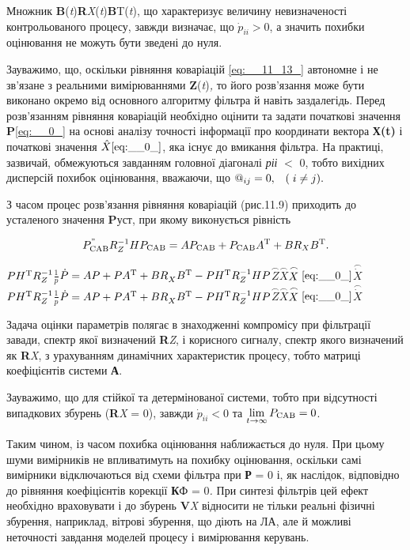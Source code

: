 Множник \textbf{B}(\textit{t})\textbf{R}\textit{X}(\textit{t})\textbf{B}T(\textit{t}), 
що характеризує величину невизначеності  контрольованого процесу, завжди визначає, 
що $\dot{p}_{ii} >0$, а значить похибки оцінювання не можуть бути зведені до нуля.

Зауважимо, 
що, оскільки рівняння коваріацій \eqref{eq:__11_13_} автономне і не зв'язане 
з реальними вимірюваннями \textbf{Z}(\textit{t})\textit{,} то його розв'язання може 
бути виконано окремо від основного алгоритму фільтра й навіть заздалегідь. Перед 
розв'язанням рівняння коваріацій необхідно оцінити та задати початкові значення \textbf{P}\eqref{eq:__0_} 
на основі аналізу точності інформації про координати вектора \textbf{Х(t)} 
і початкові значення $\hat{X}\eqref{eq:__0_}$, яка існує до вмикання фільтра. 
На практиці, зазвичай, обмежуються завданням головної діагоналі \textit{ріі }$<$ 
0, тобто вихідних дисперсій похибок оцінювання, вважаючи, що  $@_{ij} =0,{\rm \; 
\; \; (\; }i\ne j).$

З часом  процес розв'язання рівняння коваріацій (рис.11.9) приходить до усталеного  
значення \textbf{P}уст, при якому виконується рівність

\[P_{{\rm CAB}} ^{{\rm "}} R_{Z}^{-1} HP_{{\rm CAB}} =AP_{{\rm CAB}} +P_{{\rm CAB}} 
A^{{\rm T}} +BR_{X} B^{{\rm T}} .\] 

$PH^{{\rm T}} R_{Z}^{-1} $$ $$ $$\frac{1}{p} $$\dot{P}=AP+PA^{{\rm T}} +BR_{X}^{} 
B^{{\rm T}} -PH^{{\rm T}} R_{Z}^{-1} HP$$ $$ $$\stackrel{\frown}{Z}$$ $$ $$\stackrel{
\frown}{X}$$ $$ $$\stackrel{\frown}{X}\eqref{eq:__0_}$$ $$ $$\stackrel{\frown}{
\dot{X}}$$ $$ $$PH^{{\rm T}} R_{Z}^{-1} $$ $$ $$\frac{1}{p} $$\dot{P}=AP+PA^{{\rm 
T}} +BR_{X}^{} B^{{\rm T}} -PH^{{\rm T}} R_{Z}^{-1} HP$$ $$ $$\stackrel{\frown}{Z}$$ $$ $$\stackrel{
\frown}{X}$$ $$ $$\stackrel{\frown}{X}\eqref{eq:__0_}$$ $$ $$\stackrel{\frown}{
\dot{X}}$$ $$ $


Задача оцінки параметрів полягає в знаходженні компромісу при фільтрації 
завади, спектр якої визначений \textbf{R}\textit{Z}, і корисного сигналу, спектр 
якого визначений як \textbf{R}\textit{X}, з урахуванням динамічних характеристик 
процесу, тобто матриці коефіцієнтів системи \textbf{А}.

Зауважимо, що для стійкої та детермінованої системи, тобто при відсутності випадкових 
збурень (\textbf{R}\textit{X }= 0), завжди   $\dot{p}_{ii} <0$   та   $\mathop{\lim 
}\limits_{t\to \infty } P_{{\rm CAB}} =0$.

Таким чином, із часом  похибка оцінювання наближається до нуля. При цьому шуми вимірників 
не впливатимуть на похибку оцінювання, оскільки самі  вимірники  відключаються від 
схеми фільтра при \textbf{Р }= 0 і, як наслідок, відповідно до  рівняння коефіцієнтів 
корекції \textbf{К}Ф = 0\textit{.} При синтезі фільтрів цей ефект необхідно враховувати 
і до збурень \textbf{V}\textit{X} відносити не тільки реальні фізичні збурення, наприклад, 
вітрові збурення, що діють на ЛА, але й можливі неточності завдання моделей процесу 
і вимірювання керувань.

